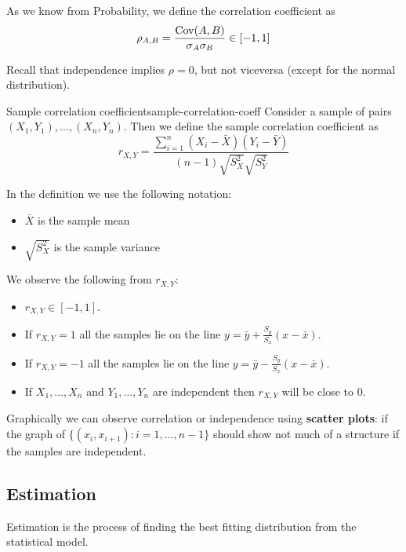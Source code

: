 \documentclass[12pt]{extarticle}
\newcommand{\cov}{{\operatorfont Cov}}
\begin{document}
As we know from Probability, we define the correlation coefficient as
\begin{equation}
    \rho_{A,B} = \frac{\cov(A, B)}{\sigma_A \sigma_B} \in [-1, 1]
\end{equation}

Recall that independence implies $\rho = 0$, but not viceversa (except for the normal distribution).

\begin{definition}{Sample correlation coefficient}{sample-correlation-coeff}
    Consider a sample of pairs $(X_1, Y_1), \dots, (X_n, Y_n)$.
    Then we define the sample correlation coefficient as
    \begin{equation}
        r_{X, Y} = \frac{\sum^n_{i = 1} (X_i - \bar{X})(Y_i - \bar{Y})}{(n-1)\sqrt{S^2_X} \sqrt{S^2_Y}}
    \end{equation}
\end{definition}

In the definition we use the following notation:
\begin{itemize}
    \item $\bar X$ is the sample mean
    \item $\sqrt{S^2_X}$ is the sample variance
\end{itemize}

We observe the following from $r_{X, Y}$:
\begin{itemize}
    \item $r_{X, Y} \in [-1, 1]$.
    \item If $r_{X, Y} = 1$ all the samples lie on the line $y = \bar y + \frac{S_y}{S_x}(x-\bar x)$.
    \item If $r_{X, Y} = -1$ all the samples lie on the line $y = \bar y - \frac{S_y}{S_x}(x-\bar x)$.
    \item If $X_1, \dots, X_n$ and $Y_1, \dots, Y_n$ are independent then $r_{X, Y}$ will be close to $0$.
\end{itemize}

Graphically we can observe correlation or independence using \textbf{scatter plots}: if the graph of $\{ (x_i, x_{i+1}) : i = 1, \dots, n-1 \}$ should show not much of a structure if the samples are independent.

\subsection{Estimation}

Estimation is the process of finding the best fitting distribution from the statistical model.
\end{document}
